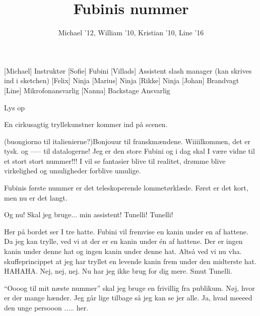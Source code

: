 \documentclass[a4paper,11pt]{article}
\title{Fubinis nummer}
\author{Michael '12, William '10, Kristian '10, Line '16}
\begin{document}
\maketitle

\begin{roles}
    [Michael] Instruktør
	[Sofie] Fubini
	[Villads] Assistent slash manager (kan skrives ind i sketchen)
[Felix] Ninja
[Marius] Ninja
[Rikke] Ninja
[Johan] Brandvagt
[Line] Mikrofonansvarlig
[Nanna] Backstage Ansvarlig
\end{roles}


\begin{props}
\end{props}

\begin{sketch}

\scene Lys op

\scene En cirkusagtig tryllekunstner kommer ind på scenen. 

 (buongiorno til italienierne?)Bonjouur til franskmændene. Wiiiilkommen, det er tysk. og ----- til datalogerne! Jeg er den store Fubini og i dag skal I være vidne til et stort stort nummer!!! I vil se fantasier blive til realitet, drømme blive virkelighed og umuligheder forblive umulige. 

Fubinis første nummer er det teleskoperende lommetørklæde. Først er det kort, men nu er det langt.


Og nu! Skal jeg bruge... min assistent! Tunelli! Tunelli!


Her på bordet ser I tre hatte.  Fubini vil fremvise en kanin under en af hattene. Da jeg kan trylle, ved vi at der er en kanin under én af hattene. Der er ingen kanin under denne hat og ingen kanin under denne hat. Altså ved vi nu vha. skuffeprincippet at jeg har tryllet en levende kanin frem under den midterste hat. HAHAHA.
 Nej, nej, nej. Nu har jeg ikke brug for dig mere. Smut Tunelli. 

``Oooog til mit næste nummer'' skal jeg bruge en frivillig fra publikum. Nøj, hvor er der mange hænder. Jeg går lige tilbage så jeg kan se jer alle. Ja, hvad meeeed den unge persooon .....  her.


\end{sketch}
\end{document}
